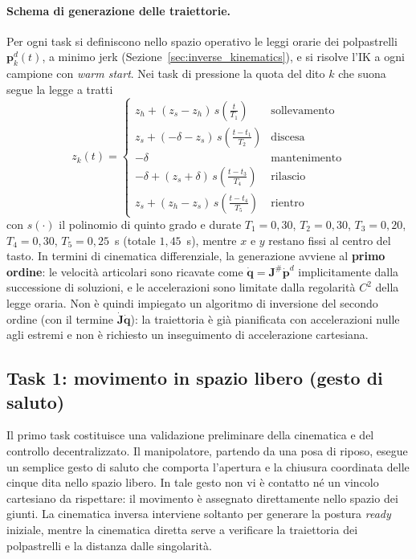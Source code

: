 \paragraph{Schema di generazione delle traiettorie.} Per ogni task si definiscono nello spazio operativo le leggi orarie dei polpastrelli $\boldsymbol p_k^d(t)$, a minimo jerk (Sezione~\ref{sec:inverse_kinematics}), e si risolve l'IK a ogni campione con \textit{warm start}. Nei task di pressione la quota del dito $k$ che suona segue la legge a tratti
\begin{equation}
    z_k(t)=
    \begin{cases}
        z_h+(z_s-z_h)\,s\!\left(\tfrac{t}{T_1}\right) & \text{sollevamento}\\[0.5ex]
        z_s+(-\delta-z_s)\,s\!\left(\tfrac{t-t_1}{T_2}\right) & \text{discesa}\\[0.5ex]
        -\delta & \text{mantenimento}\\[0.5ex]
        -\delta+(z_s+\delta)\,s\!\left(\tfrac{t-t_3}{T_4}\right) & \text{rilascio}\\[0.5ex]
        z_s+(z_h-z_s)\,s\!\left(\tfrac{t-t_4}{T_5}\right) & \text{rientro}
    \end{cases}
    \label{eq:press_profile}
\end{equation}
con $s(\cdot)$ il polinomio di quinto grado e durate $T_1=0{,}30$, $T_2=0{,}30$, $T_3=0{,}20$, $T_4=0{,}30$, $T_5=0{,}25$~s (totale $1{,}45$~s), mentre $x$ e $y$ restano fissi al centro del tasto. In termini di cinematica differenziale, la generazione avviene al \textbf{primo ordine}: le velocità articolari sono ricavate come $\dot{\boldsymbol q}=\boldsymbol J^{\#}\dot{\boldsymbol p}^d$ implicitamente dalla successione di soluzioni, e le accelerazioni sono limitate dalla regolarità $C^2$ della legge oraria. Non è quindi impiegato un algoritmo di inversione del secondo ordine (con il termine $\dot{\boldsymbol J}\dot{\boldsymbol q}$): la traiettoria è già pianificata con accelerazioni nulle agli estremi e non è richiesto un inseguimento di accelerazione cartesiana.

\subsection{Task 1: movimento in spazio libero (gesto di saluto)}

Il primo task costituisce una validazione preliminare della cinematica e del controllo decentralizzato. 
Il manipolatore, partendo da una posa di riposo, esegue un semplice gesto di saluto che comporta l'apertura e la chiusura coordinata delle cinque dita nello spazio libero.
In tale gesto non vi è contatto né un vincolo cartesiano da rispettare: il movimento è assegnato direttamente nello spazio dei giunti. 
La cinematica inversa interviene soltanto per generare la postura \textit{ready} iniziale, mentre la cinematica diretta serve a verificare la traiettoria dei polpastrelli e la distanza dalle singolarità.

